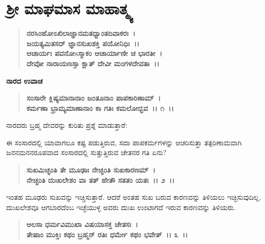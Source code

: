 

\begin{center}
\phantom{श्रीः}
\end{center}

\begin{center}
\phantom{।। श्री गुरुराजो विजयते~।।}
\end{center}


\chapter{ ಶ‍್ರೀ ಮಾಘಮಾಸ ಮಾಹಾತ್ಮ್ಯ}

\begin{verse}
\textbf{ನರಸಿಂಹೋಽಖಿಲಾಜ್ಞಾನಮತಧ್ವಾಂತದಿವಾಕರಃ~। }\\\textbf{ಜಯತ್ಯಮಿತಸದ್ ಜ್ಞಾನಸುಖಶಕ್ತಿ ಪಯೋನಿಧಿಃ~।।}\\\textbf{ಆಚಾರ್ಯಃ ಪವನೋsಸ್ಮಾಕಂ ಆಚಾರ್ಯಾಣೀ ಚ ಭಾರತೀ~। }\\\textbf{ದೇವೋ ನಾರಾಯಣಸ್ಸಾ ಕ್ಷಾತ್ ದೇವೀ ಮಂಗಳದೇವತಾ~।।}
\end{verse}

\begin{flushleft}
\textbf{ನಾರದ ಉವಾಚ}
\end{flushleft}

\begin{verse}
\textbf{ಸಂಸಾರೇ ಕ್ಲಿಷ್ಯಮಾನಾನಾಂ ಜಂತೂನಾಂ ಪಾಪಕಾರಿಣಾಮ್~। }\\\textbf{ಕರ್ಮಣಾ ಭ್ರಾಮ್ಯಮಾಣಾನಾಂ ಕಾ ಗತಿಃ ಕಮಲೋದ್ಭವ~।। ೧~।।}
\end{verse}

\noindent
ನಾರದರು ಬ್ರಹ್ಮ ದೇವರನ್ನು ಕುರಿತು ಪ್ರಶ್ನೆ ಮಾಡುತ್ತಾರೆ:

ಈ ಸಂಸಾರದಲ್ಲಿ ಯಾವಾಗಲೂ ಕಷ್ಟ ಪಡುತ್ತಿರುವ, ಸದಾ ಪಾಪಕರ್ಮಗಳನ್ನು ಆಚರಿಸುತ್ತಾ ತತ್ಪರಿಣಾಮವಾಗಿ ಜನನಮನನರೂಪವಾದ ಸಂಸಾರದಲ್ಲಿ ಸುತ್ತುತ್ತಿರುವ ಚೇತನರ ಗತಿ ಏನು?

\begin{verse}
\textbf{ಸುಖಮಿಚ್ಛಂತಿ ತೇ ಮೂಢಾಃ ನೇಚ್ಛಂತಿ ಸುಖಕಾರಣಮ್~।}\\\textbf{ನೇಚ್ಛಂತಿ ದುಃಖಲೇಶಂ ವಾ ತತ್ ಹೇತೌ ಸತತಂ ಯತಃ~।। ೨~।।}
\end{verse}

ಇಂತಹ ಮೂಢರು ಸುಖವನ್ನು ಇಚ್ಚಿಸುತ್ತಾರೆ. ಆದರೆ ಅಂತಹ ಸುಖ ಬರುವ ಕಾರಣ\-ವನ್ನು ತಿಳಿಯಲು ಇಚ್ಛಿಸುವುದಿಲ್ಲ. ದುಃಖಲೇಶವೂ ಆಗಬಾರದೆಂಬ ಇಚ್ಛೆಯುಳ್ಳ ಅವರು ದುಃಖ ಉಂಟಾಗದೆ ಇರುವ ಕಾರಣವನ್ನು ತಿಳಿಯರು.

\begin{verse}
\textbf{ಅಲಸಾ ಧರ್ಮವಿಮುಖಾ ವಿಷಯಾಸಕ್ತ ಚೇತಸಃ~।}\\\textbf{ತೇಷಾಂ ಮುಕ್ತಿಃ ಕಥಂ ಬ್ರಹ್ಮನ್ ರತಿಃ ಧರ್ಮೇ ಕಥಂ ಭವೇತ್~।। ೩~।।}
\end{verse}

